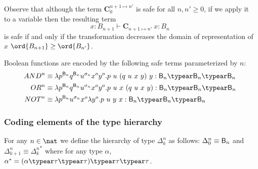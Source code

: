 Observe that although the term $\mathbf{C}^{n+1\mapsto n'}_0$ is safe for all $n,n'\geq 0$, if we apply it to a variable then the resulting term
$$ x:B_{n+1} \vdash \mathbf{C}_{n+1\mapsto n'}~x : B_{n}$$
is safe if and only if the transformation decreases the domain of representation of $x$ \ie $\ord{B_{n+1}}\geq\ord{B_{n'}}$.


Boolean functions are encoded by the following safe terms parameterized by $n$:
\begin{align*}
AND^n &\equiv \lambda p^{\booltype_n} q^{\booltype_n} u^{\sigma_n} x^o y^o . p~u~(q~u~x~y)~y : \booltype_n\typear\booltype_n\typear\booltype_n \\
OR^n &\equiv \lambda p^{\booltype_n} q^{\booltype_n} u^{\sigma_n} x^o y^o . p~u~x~(q~u~x~y) : \booltype_n\typear\booltype_{n}\typear\booltype_n \\
NOT^n &\equiv \lambda p^{\booltype_n} u^{\sigma_n} x^o \lambda y^o . p~u~y~x : \booltype_n\typear\booltype_n\typear\booltype_n
\end{align*}

\subsubsection{Coding elements of the type hierarchy}
For any $n\in\nat$ we define the hierarchy of type $\Delta_k^n$ as follows:
$\Delta_0^n \equiv \mathsf{B}_n$ and $\Delta_{k+1}^n \equiv {\Delta_k^n}^*$ where for any type $\alpha$, $\alpha^* = (\alpha \typear \tau \typear \tau)\typear \tau \typear \tau$.


